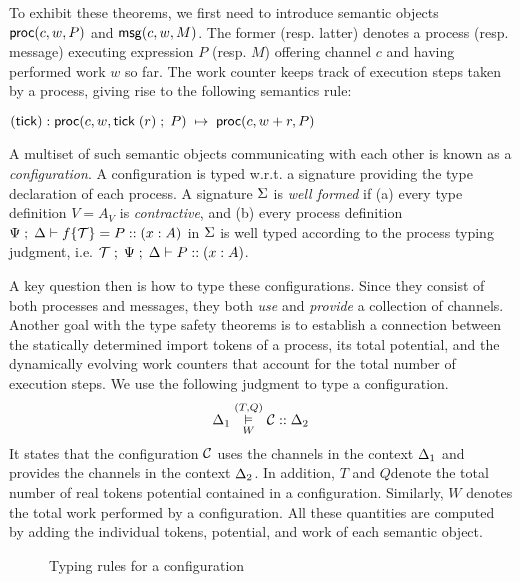 To exhibit these theorems, we first need to introduce semantic objects
$\mathsf{proc}(c, w, P)$ and $\mathsf{msg}(c, w, M)$.
The former (resp. latter) denotes a process (resp. message) executing
expression $P$ (resp. $M$) offering channel $c$ and having performed
work $w$ so far.
The work counter keeps track of execution steps taken by a process,
giving rise to the following semantics rule:
\begin{tabbing}
  $(\mathsf{tick}) : \mathsf{proc}(c, w, \mathsf{tick} \; (r) \; ; \; P) \; \mapsto \; \mathsf{proc}(c, w+r, P)$
\end{tabbing}
A multiset of such semantic objects communicating with each other
is known as a \emph{configuration}.
A configuration is typed w.r.t. a signature providing the type declaration
of each process.
A signature $\Sigma$ is \emph{well formed} if
(a) every type definition $V = A_V$ is \emph{contractive},
and (b) every process definition
$\Psi \; ; \; \Delta \vdash f \{\mathcal{T}\} = P :: (x : A)$ in $\Sigma$
is well typed according to the process typing judgment, i.e.
$\mathcal{T} \; ; \; \Psi \; ; \; \Delta \vdash P :: (x : A)$.
 
A key question then is how to type these configurations.
Since they consist of both processes and messages, they
both \emph{use} and \emph{provide} a collection of channels.
Another goal with the type safety theorems is to establish a connection
between the statically determined import tokens of a process,
its total potential, and the dynamically evolving work counters
that account for the total number of execution steps.
We use the following judgment to type a configuration.
\[
\Delta_1 \overset{(T, Q)}{\underset{W}{\vDash}} \mathcal{C} :: \Delta_2
\]
It states that the configuration $\mathcal{C}$
uses the channels in the context $\Delta_1$ and provides the channels in
the context $\Delta_2$.
In addition, $T$ and $Q$denote the total number of real tokens
potential contained in a configuration.
Similarly, $W$ denotes the total work performed by a configuration.
All these quantities are computed by adding the individual tokens,
potential, and work of each semantic object.
\begin{figure}[t]
\caption{Typing rules for a configuration}
\label{fig:config_typing}
\end{figure}

